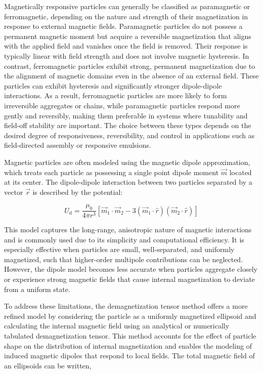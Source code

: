 Magnetically responsive particles can generally be classified as paramagnetic or ferromagnetic, depending on the nature and strength of their magnetization in response to external 
magnetic fields. Paramagnetic particles do not possess a permanent magnetic moment but acquire a reversible magnetization that aligns with the applied field and 
vanishes once the field is removed. \cite{sinn_magnetically_2011} Their response is typically linear with field strength and does not involve magnetic hysteresis. 
In contrast, ferromagnetic particles exhibit strong, permanent magnetization due to the alignment of magnetic domains even in the absence of an external field. These particles can 
exhibit hysteresis and significantly stronger dipole-dipole interactions. \cite{sinn_magnetically_2011}
As a result, ferromagnetic particles are more likely to form irreversible aggregates or chains, while paramagnetic particles 
respond more gently and reversibly, making them preferable in systems where tunability and field-off stability are important. The choice between these types depends on the desired 
degree of responsiveness, reversibility, and control in applications such as field-directed assembly or responsive emulsions.

Magnetic particles are often modeled using the magnetic dipole approximation, which treats each particle as possessing a single point dipole moment \(\vec{m}\) located at its center.
\cite{davies_assembling_2014}
The dipole-dipole interaction between two particles separated by a vector \(\vec{r}\) is described by the potential:

\begin{equation}
    U_{\text{d}} = \frac{\mu_0}{4\pi r^3} \left[ \vec{m}_1 \cdot \vec{m}_2 - 3(\vec{m}_1 \cdot \hat{r})(\vec{m}_2 \cdot \hat{r}) \right]
\end{equation}

This model captures the long-range, anisotropic nature of magnetic interactions and is commonly used due to its simplicity and computational efficiency. It is especially effective when 
particles are small, well-separated, and uniformly magnetized, such that higher-order multipole contributions can be neglected. However, the dipole model becomes less accurate when particles 
aggregate closely or experience strong magnetic fields that cause internal magnetization to deviate from a uniform state.

To address these limitations, the demagnetization tensor method offers a more refined model by considering the particle as a uniformly magnetized ellipsoid and calculating the internal magnetic 
field using an analytical or numerically tabulated demagnetization tensor. \cite{takahashi_ellipsoids_2017} 
This method accounts for the effect of particle shape on the distribution of internal magnetization and enables the modeling of induced magnetic 
dipoles that respond to local fields. The total magnetic field of an ellipsoids can be written,

